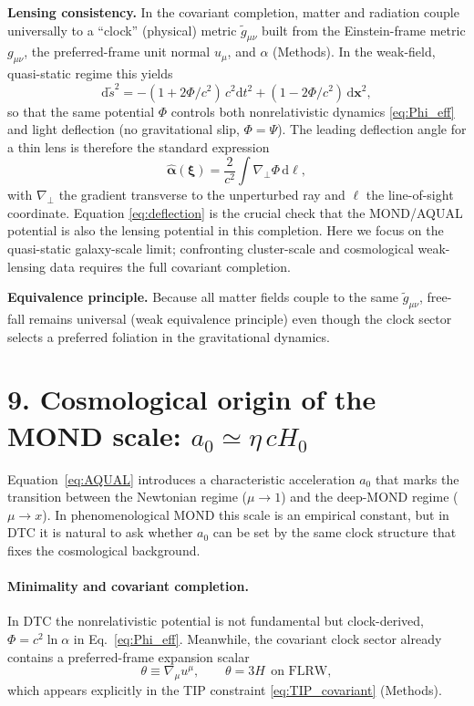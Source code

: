 \documentclass[12pt]{article}
\newcommand{\dd}{\mathrm{d}}
\newcommand{\alphaReg}{\alpha}
\begin{document}
\textbf{Lensing consistency.}
In the covariant completion, matter and radiation couple universally to a ``clock'' (physical) metric $\tilde g_{\mu\nu}$ built from the Einstein-frame metric $g_{\mu\nu}$, the preferred-frame unit normal $u_{\mu}$, and $\alphaReg$ (Methods). In the weak-field, quasi-static regime this yields
\begin{equation}
\dd \tilde s^{2}=-(1+2\Phi/c^{2})\,c^{2}\dd t^{2}+(1-2\Phi/c^{2})\,\dd\bm{x}^{2},
\label{eq:weak_metric}
\end{equation}
so that the same potential $\Phi$ controls both nonrelativistic dynamics \eqref{eq:Phi_eff} and light deflection (no gravitational slip, $\Phi=\Psi$). The leading deflection angle for a thin lens is therefore the standard expression \citep{BartelmannSchneider2001}
\begin{equation}
\hat{\bm{\alpha}}(\bm{\xi})=\frac{2}{c^{2}}\int \nabla_{\perp}\Phi\,\dd \ell,
\label{eq:deflection}
\end{equation}
with $\nabla_{\perp}$ the gradient transverse to the unperturbed ray and $\ell$ the line-of-sight coordinate. Equation \eqref{eq:deflection} is the crucial check that the MOND/AQUAL potential is also the lensing potential in this completion. Here we focus on the quasi-static galaxy-scale limit; confronting cluster-scale and cosmological weak-lensing data requires the full covariant completion.

\textbf{Equivalence principle.}
Because all matter fields couple to the same $\tilde g_{\mu\nu}$, free-fall remains universal (weak equivalence principle) even though the clock sector selects a preferred foliation in the gravitational dynamics.

\section*{9. Cosmological origin of the MOND scale: $a_{0}\simeq \eta\,cH_{0}$}
\label{sec:a0cH}

Equation~\eqref{eq:AQUAL} introduces a characteristic acceleration $a_{0}$ that marks the transition between the Newtonian regime ($\mu\!\to\!1$) and the deep-MOND regime ($\mu\!\to\!x$). In phenomenological MOND this scale is an empirical constant, but in DTC it is natural to ask whether $a_{0}$ can be set by the same clock structure that fixes the cosmological background.

\paragraph{Minimality and covariant completion.}
In DTC the nonrelativistic potential is not fundamental but clock-derived,
$\Phi=c^{2}\ln\alphaReg$ in Eq.~\eqref{eq:Phi_eff}. Meanwhile, the covariant clock sector already contains a preferred-frame expansion scalar
\begin{equation}
\theta\equiv \nabla_{\mu}u^{\mu},
\qquad
\theta=3H \ \ \text{on FLRW},
\label{eq:theta_def}
\end{equation}
which appears explicitly in the TIP constraint \eqref{eq:TIP_covariant} (Methods).
\end{document}
